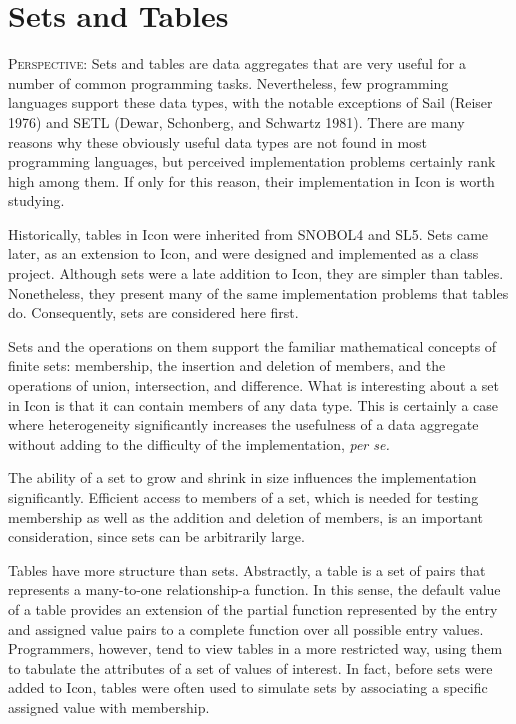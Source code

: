 \chapter{Sets and Tables}
\label{ST-Chapter}

\textsc{Perspective}: Sets and tables are data aggregates that are
very useful for a number of common programming tasks.  Nevertheless,
few programming languages support these data types, with the notable
exceptions of Sail (Reiser 1976) and SETL (Dewar, Schonberg, and
Schwartz 1981). There are many reasons why these obviously useful data
types are not found in most programming languages, but perceived
implementation problems certainly rank high among them. If only for
this reason, their implementation in Icon is worth studying.

Historically, tables in Icon were inherited from SNOBOL4 and SL5. Sets
came later, as an extension to Icon, and were designed and implemented
as a class project. Although sets were a late addition to Icon, they
are simpler than tables.  Nonetheless, they present many of the same
implementation problems that tables do. Consequently, sets are
considered here first.

Sets and the operations on them support the familiar mathematical
concepts of finite sets: membership, the insertion and deletion of
members, and the operations of union, intersection, and
difference. What is interesting about a set in Icon is that it can
contain members of any data type. This is certainly a case where
heterogeneity significantly increases the usefulness of a data
aggregate without adding to the difficulty of the implementation,
\textit{per se.}

The ability of a set to grow and shrink in size influences the
implementation significantly. Efficient access to members of a set,
which is needed for testing membership as well as the addition and
deletion of members, is an important consideration, since sets can be
arbitrarily large.


Tables have more structure than sets. Abstractly, a table is a set of
pairs that represents a many-to-one relationship-a function. In this
sense, the default value of a table provides an extension of the
partial function represented by the entry and assigned value pairs to
a complete function over all possible entry values. Programmers,
however, tend to view tables in a more restricted way, using them to
tabulate the attributes of a set of values of interest. In fact,
before sets were added to Icon, tables were often used to simulate
sets by associating a specific assigned value with membership.

